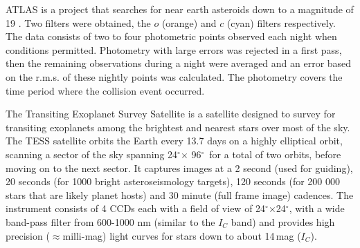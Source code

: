 \documentclass[sn-nature,oneside]{sn-jnl}%
\newcommand*\degr{\ensuremath{^\circ}}
\begin{document}

ATLAS is a project that searches for near earth asteroids down to a magnitude of 19 \cite{Tonry18}.
%
Two filters were obtained, the $o$ (orange) and $c$ (cyan) filters respectively.
%
The data consists of two to four photometric points observed each night when conditions permitted.
%
Photometry with large errors was rejected in a first pass, then the remaining observations during a night were averaged and an error based on the r.m.s. of these nightly points was calculated.
%
The photometry covers the time period where the collision event occurred. 





The Transiting Exoplanet Survey Satellite \cite[TESS; ][]{2015JATIS...1a4003R} is a satellite designed to survey for transiting exoplanets among the brightest and nearest stars over most of the sky.
%
The TESS satellite orbits the Earth every 13.7 days on a highly elliptical orbit, scanning a sector of the sky spanning 24\degr $\times$ 96\degr\ for a total of two orbits, before moving on to the next sector. 
%
It captures images at a 2 second (used for guiding), 20 seconds (for 1000 bright asteroseismology targets), 120 seconds (for 200 000 stars that are likely planet hosts) and 30 minute (full frame image) cadences.
%
The instrument consists of 4 CCDs each with a field of view of 24\degr$\times$24\degr, with a wide band-pass filter from 600-1000 nm (similar to the $I_C$ band) and provides high precision ($\approx$milli-mag) light curves for stars down to about 14\,mag ($I_C$).
\end{document}
